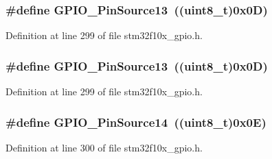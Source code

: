\subsubsection[{\texorpdfstring{G\+P\+I\+O\+\_\+\+Pin\+Source13}{GPIO_PinSource13}}]{\setlength{\rightskip}{0pt plus 5cm}\#define G\+P\+I\+O\+\_\+\+Pin\+Source13~(({\bf uint8\+\_\+t})0x0\+D)}\hypertarget{group___g_p_i_o___pin__sources_gace4beb385facd306324fa9e362df5fda}{}\label{group___g_p_i_o___pin__sources_gace4beb385facd306324fa9e362df5fda}


Definition at line 299 of file stm32f10x\+\_\+gpio.\+h.

\subsubsection[{\texorpdfstring{G\+P\+I\+O\+\_\+\+Pin\+Source13}{GPIO_PinSource13}}]{\setlength{\rightskip}{0pt plus 5cm}\#define G\+P\+I\+O\+\_\+\+Pin\+Source13~(({\bf uint8\+\_\+t})0x0\+D)}\hypertarget{group___g_p_i_o___pin__sources_gace4beb385facd306324fa9e362df5fda}{}\label{group___g_p_i_o___pin__sources_gace4beb385facd306324fa9e362df5fda}


Definition at line 299 of file stm32f10x\+\_\+gpio.\+h.

\subsubsection[{\texorpdfstring{G\+P\+I\+O\+\_\+\+Pin\+Source14}{GPIO_PinSource14}}]{\setlength{\rightskip}{0pt plus 5cm}\#define G\+P\+I\+O\+\_\+\+Pin\+Source14~(({\bf uint8\+\_\+t})0x0\+E)}\hypertarget{group___g_p_i_o___pin__sources_ga5fbb540a86af4015a46ac16c61ddb1f7}{}\label{group___g_p_i_o___pin__sources_ga5fbb540a86af4015a46ac16c61ddb1f7}


Definition at line 300 of file stm32f10x\+\_\+gpio.\+h.

